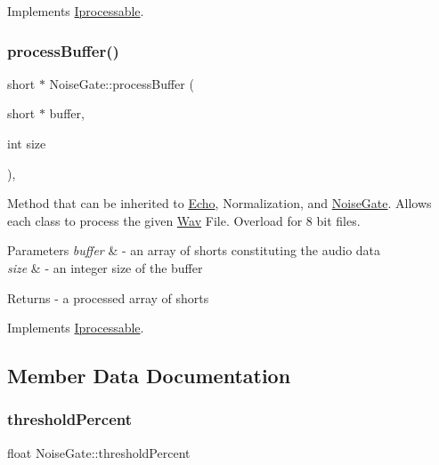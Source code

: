 Implements \hyperlink{classIprocessable_a6f0ff631112fba8eb55d9760b41987ea}{Iprocessable}.

\mbox{\label{classNoiseGate_a05c33d8853ee2764af12cce10ae0e59d}} 
\subsubsection{\texorpdfstring{process\+Buffer()}{processBuffer()}\hspace{0.1cm}{\footnotesize\ttfamily [2/2]}}
{\footnotesize\ttfamily short $\ast$ Noise\+Gate\+::process\+Buffer (\begin{DoxyParamCaption}\item[{short $\ast$}]{buffer,  }\item[{int}]{size }\end{DoxyParamCaption})\hspace{0.3cm}{\ttfamily [override]}, {\ttfamily [virtual]}}

Method that can be inherited to \hyperlink{classEcho}{Echo}, Normalization, and \hyperlink{classNoiseGate}{Noise\+Gate}. Allows each class to process the given \hyperlink{classWav}{Wav} File. Overload for 8 bit files. 
\begin{DoxyParams}{Parameters}
{\em buffer} & -\/ an array of shorts constituting the audio data \\
\hline
{\em size} & -\/ an integer size of the buffer \\
\hline
\end{DoxyParams}
\begin{DoxyReturn}{Returns}
-\/ a processed array of shorts 
\end{DoxyReturn}


Implements \hyperlink{classIprocessable_a3a379ff1aab98b507892319afbd7eef0}{Iprocessable}.



\subsection{Member Data Documentation}
\mbox{\label{classNoiseGate_a625000d0a0548d52795a3df0f165f275}} 
\subsubsection{\texorpdfstring{threshold\+Percent}{thresholdPercent}}
{\footnotesize\ttfamily float Noise\+Gate\+::threshold\+Percent\hspace{0.3cm}{\ttfamily [private]}}

